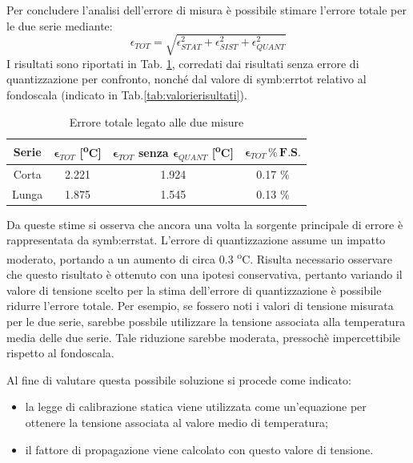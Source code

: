 Per concludere l'analisi dell'errore di misura è possibile stimare l'errore totale per le due serie mediante:
\begin{equation}
	\epsilon_{\textit{TOT}}=\sqrt{\epsilon_{\textit{STAT}}^2+\epsilon_{\textit{SIST}}^2+\epsilon_{\textit{QUANT}}^2}
\end{equation}
I risultati sono riportati in Tab. \ref{tab:risultatitot}, corredati dai risultati senza errore di quantizzazione per confronto, nonché dal valore di \gls{symb:errtot} relativo al fondoscala (indicato in Tab.\ref{tab:valorierisultati}).
\begin{table}[H]
	\centering
	\begin{tabular}{c|c|c|c}
		\toprule
		\toprule
	\textbf{Serie} & $\bm{\epsilon_{\textit{TOT}}}$ \textbf{[\textsuperscript{o}C]} & $\bm{\epsilon_{\textit{TOT}}}$ \textbf{senza} $\bm{\epsilon_{\textit{QUANT}}}$ \textbf{[\textsuperscript{o}C]}&  $\bm{\epsilon_{\textit{TOT}}\, \% \,F.S.}$ \\
		\midrule
		Corta & 2.221 & 1.924 & 0.17 \%\\
		\midrule
		Lunga & 1.875 &  1.545 & 0.13 \%\\
		\bottomrule
		\bottomrule
	\end{tabular}
	\caption{Errore totale legato alle due misure}
	\label{tab:risultatitot}
\end{table}
Da queste stime si osserva che ancora una volta la sorgente principale di errore è rappresentata da \gls{symb:errstat}. L'errore di quantizzazione assume un impatto moderato, portando a un aumento di circa 0.3 \textsuperscript{o}C.
Risulta necessario osservare che questo risultato è ottenuto con una ipotesi conservativa, pertanto variando il valore di tensione scelto per la stima dell'errore di quantizzazione è possibile ridurre l'errore totale. Per esempio, se fossero noti i valori di tensione misurata per le due serie, sarebbe possbile utilizzare la tensione associata alla temperatura media delle due serie. Tale riduzione sarebbe moderata, pressochè impercettibile rispetto al fondoscala. 

Al fine di valutare questa possibile soluzione si procede come indicato:
\begin{itemize}
	\item la legge di calibrazione statica viene utilizzata come un'equazione per ottenere la tensione associata al valore medio di temperatura;
	\item il fattore di propagazione viene calcolato con questo valore di tensione. 
\end{itemize} 

